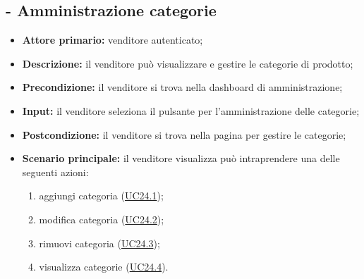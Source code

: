 \subsection{ - Amministrazione categorie}
\begin{itemize}
    \item \textbf{Attore primario:} venditore autenticato;
    \item \textbf{Descrizione:}  il venditore può visualizzare e gestire le categorie di prodotto;
    \item \textbf{Precondizione:}  il venditore si trova nella dashboard di amministrazione;
    \item \textbf{Input:} il venditore seleziona il pulsante per l'amministrazione delle categorie;
    \item \textbf{Postcondizione:} il venditore si trova nella pagina per gestire le categorie;
    \item \textbf{Scenario principale:} il venditore visualizza può intraprendere una delle seguenti azioni:
          \begin{enumerate}
              \item aggiungi categoria (\hyperref[UC24.1]{UC24.1});
              \item modifica categoria (\hyperref[UC24.2]{UC24.2});
              \item rimuovi categoria (\hyperref[UC24.3]{UC24.3});
              \item visualizza categorie (\hyperref[UC24.4]{UC24.4}).
          \end{enumerate}
\end{itemize}

\stepsubUserCase
